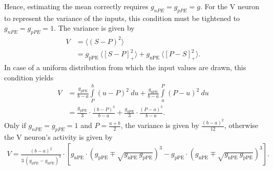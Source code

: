\documentclass[10pt,a4paper,draft]{article}
\begin{document}
%
Hence, estimating the mean correctly requires $g_{nPE} = g_{pPE} = g$. For the V neuron to represent the variance of the inputs, this condition must be tightened to  $g_{nPE} = g_{pPE} = 1$. The variance is given by
%
\begin{align}
\label{eq:condition_variance_gain}
V &= \langle (S-P)^2\rangle \\
   &= g_\mathrm{pPE}\ \langle \left[ S-P \right]_+^2 \rangle + g_\mathrm{nPE}\ \langle \left[ P-S \right]_+^2 \rangle. \nonumber
\end{align}
%
In case of a uniform distribution from which the input values are drawn, this condition yields
%
\begin{align}
\label{eq:condition_variance_gain_uniform_dist}
V &= \frac{g_\mathrm{pPE}}{b-a} \int\limits_P^b (u-P)^2\ du + \frac{g_\mathrm{nPE}}{b-a} \int\limits_a^P (P-u)^2\ du \\
   &= \frac{g_\mathrm{pPE}}{3} \cdot \frac{(b-P)^3}{b-a} + \frac{g_\mathrm{nPE}}{3} \cdot \frac{(P-a)^3}{b-a}. \nonumber
\end{align}
%
Only if $g_{nPE} = g_{pPE} = 1$ and $P = \frac{a + b}{2}$, the variance is given by $\frac{(b - a)^2}{12}$, otherwise the V neuron's activity is given by
%
\begin{align}
\label{eq:condition_variance_gain_uniform_dist_1}
V = \frac{(b-a)^2}{3\ (g_\mathrm{pPE} - g_\mathrm{nPE})^3} \cdot \left[ g_\mathrm{nPE} \cdot( g_\mathrm{pPE} \mp \sqrt{g_\mathrm{nPE}\ g_\mathrm{pPE}})^3 - g_\mathrm{pPE} \cdot (g_\mathrm{nPE} \mp \sqrt{g_\mathrm{nPE}\ g_\mathrm{pPE}})^3\right].
\end{align}
%
\end{document}
